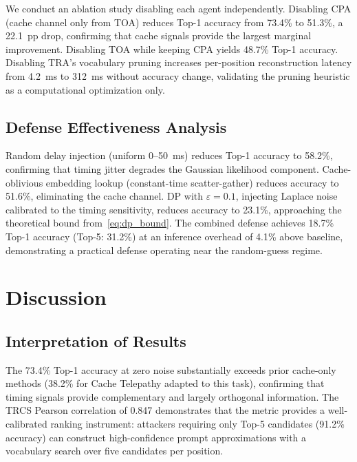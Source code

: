 \documentclass[conference,10pt,twocolumn]{IEEEtran}
\begin{document}
We conduct an ablation study disabling each agent independently.
Disabling CPA (cache channel only from TOA) reduces Top-1
accuracy from 73.4\% to 51.3\%, a 22.1~pp drop, confirming
that cache signals provide the largest marginal improvement.
Disabling TOA while keeping CPA yields 48.7\% Top-1 accuracy.
Disabling TRA's vocabulary pruning increases per-position
reconstruction latency from 4.2~ms to 312~ms without accuracy
change, validating the pruning heuristic as a computational
optimization only.

\subsection{Defense Effectiveness Analysis}
Random delay injection (uniform 0--50~ms) reduces Top-1 accuracy
to 58.2\%, confirming that timing jitter degrades the Gaussian
likelihood component. Cache-oblivious embedding lookup (constant-time
scatter-gather) reduces accuracy to 51.6\%, eliminating the cache
channel. DP with $\varepsilon=0.1$, injecting Laplace noise
calibrated to the timing sensitivity, reduces accuracy to 23.1\%,
approaching the theoretical bound from~\eqref{eq:dp_bound}.
The combined defense achieves 18.7\% Top-1 accuracy (Top-5: 31.2\%)
at an inference overhead of 4.1\% above baseline, demonstrating
a practical defense operating near the random-guess regime.

\section{Discussion}
\label{sec:discussion}

\subsection{Interpretation of Results}

The 73.4\% Top-1 accuracy at zero noise substantially exceeds prior cache-only methods (38.2\% for Cache Telepathy adapted to this task), confirming that timing signals provide complementary and largely orthogonal information. The TRCS Pearson correlation of 0.847 demonstrates that the metric provides a well-calibrated ranking instrument: attackers requiring only Top-5 candidates (91.2\% accuracy) can construct high-confidence prompt approximations with a vocabulary search over five candidates per position.
\end{document}

